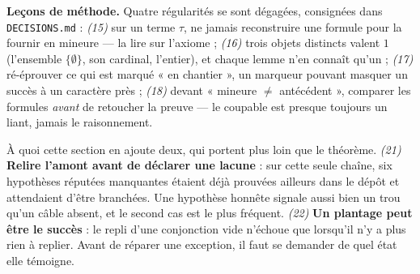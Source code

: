 \textbf{Leçons de méthode.} Quatre régularités se sont dégagées, consignées dans
\texttt{DECISIONS.md} : \emph{(15)} sur un terme $\tau$, ne jamais reconstruire une
formule pour la fournir en mineure --- la lire sur l'axiome ; \emph{(16)} trois objets
distincts valent $1$ (l'ensemble $\{\emptyset\}$, son cardinal, l'entier), et chaque
lemme n'en connaît qu'un ; \emph{(17)} ré-éprouver ce qui est marqué « en chantier »,
un marqueur pouvant masquer un succès à un caractère près ; \emph{(18)} devant
« mineure $\ne$ antécédent », comparer les formules \emph{avant} de retoucher la
preuve --- le coupable est presque toujours un liant, jamais le raisonnement.

À quoi cette section en ajoute deux, qui portent plus loin que le théorème.
\emph{(21)} \textbf{Relire l'amont avant de déclarer une lacune} : sur cette seule
chaîne, six hypothèses réputées manquantes étaient déjà prouvées ailleurs dans le
dépôt et attendaient d'être branchées. Une hypothèse honnête signale aussi bien un
trou qu'un câble absent, et le second cas est le plus fréquent.
\emph{(22)} \textbf{Un plantage peut être le succès} : le repli d'une conjonction
vide n'échoue que lorsqu'il n'y a plus rien à replier. Avant de réparer une
exception, il faut se demander de quel état elle témoigne.
